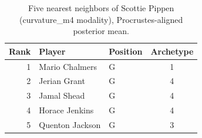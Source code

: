 \begin{table}[htbp]
  \centering\small
  \begin{tabular}{rllc}
    \toprule
    Rank & Player & Position & Archetype \\
    \midrule
    1 & Mario Chalmers & G & 1 \\
    2 & Jerian Grant & G & 4 \\
    3 & Jamal Shead & G & 4 \\
    4 & Horace Jenkins & G & 4 \\
    5 & Quenton Jackson & G & 3 \\
    \bottomrule
  \end{tabular}
  \caption{Five nearest neighbors of Scottie Pippen (curvature_m4 modality), Procrustes-aligned posterior mean.}
  \label{tab:Scottie_Pippen_neighbors_curvature_m4}
\end{table}

